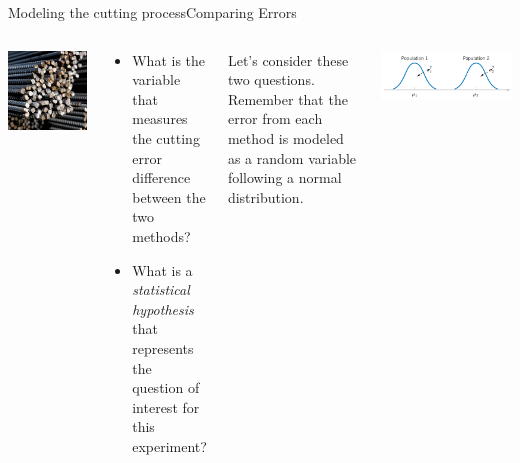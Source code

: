 \begin{frame}[t]{Modeling the cutting process}{Comparing Errors}
  \begin{columns}[T]
    \includegraphics[width=\textwidth]{../img/steelrods}
    \begin{block}{}
    {\smaller
    \begin{itemize}
      \item What is the variable that measures the cutting error difference between the two methods?
      \item What is a \emph{statistical hypothesis} that represents the question of interest for this experiment?
    \end{itemize}}
    \end{block}
    Let's consider these two questions. Remember that the error from each method is modeled as a random variable following a normal distribution.
    \begin{center}
      \includegraphics[width=.5\textwidth]{../img/two_population_model}
    \end{center}
  \end{columns}
\end{frame}

